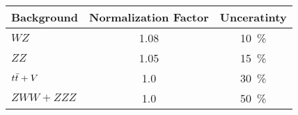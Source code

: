    \begin{tabular}{|l|cc|}
    \hline
    Background & Normalization Factor & Unceratinty \\ 
    \hline\hline
    $WZ$ & 1.08 & 10~\% \\
    $ZZ$ & 1.05 & 15~\% \\
    $t\bar{t} +V$ & 1.0 & 30~\% \\
    $ZWW+ZZZ$ & 1.0 & 50~\% \\
    \hline
  \end{tabular}
  
